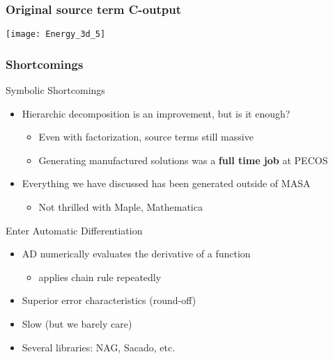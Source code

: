\documentclass[mathserif]{beamer}
\begin{document}

\begin{frame}
  \frametitle{Original source term C-output}
  \vspace{-15pt}
  \hspace{-1cm}\quad
  \texttt{[image: Energy\_3d\_5]}
\end{frame}

\begin{frame}
\frametitle{Shortcomings}

\begin{block}{Symbolic Shortcomings}
 \begin{itemize}
  \item Hierarchic decomposition is an improvement, but is it enough?
	\begin{itemize}	 
	 \item Even with factorization, source terms still massive
	 \item Generating manufactured solutions was a {\bf full time job} at PECOS
	\end{itemize}
  \item Everything we have discussed has been generated outside of MASA
	\begin{itemize}
	 \item Not thrilled with Maple, Mathematica
	\end{itemize}
 \end{itemize}
\end{block}

\begin{block}{Enter Automatic Differentiation}
 \begin{itemize}
  \item AD numerically evaluates the derivative of a function 
	\begin{itemize}
	 \item applies chain rule repeatedly 
	\end{itemize}
  \item Superior error characteristics (round-off)
  \item Slow (but we barely care)
  \item Several libraries: NAG, Sacado, etc.
 \end{itemize}
\end{block}
\end{frame}
\end{document}
